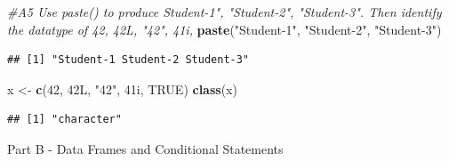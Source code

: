 \documentclass[
]{article}
\newenvironment{Shaded}{\begin{snugshade}}{\end{snugshade}}
\newcommand{\CommentTok}[1]{\textcolor[rgb]{0.56,0.35,0.01}{\textit{#1}}}
\newcommand{\ConstantTok}[1]{\textcolor[rgb]{0.56,0.35,0.01}{#1}}
\newcommand{\DataTypeTok}[1]{\textcolor[rgb]{0.13,0.29,0.53}{#1}}
\newcommand{\DecValTok}[1]{\textcolor[rgb]{0.00,0.00,0.81}{#1}}
\newcommand{\FunctionTok}[1]{\textcolor[rgb]{0.13,0.29,0.53}{\textbf{#1}}}
\newcommand{\NormalTok}[1]{#1}
\newcommand{\OtherTok}[1]{\textcolor[rgb]{0.56,0.35,0.01}{#1}}
\newcommand{\StringTok}[1]{\textcolor[rgb]{0.31,0.60,0.02}{#1}}
\begin{document}
\begin{Shaded}
\begin{Highlighting}[]
\CommentTok{\#A5 Use paste() to produce Student{-}1", "Student{-}2", "Student{-}3". Then identify the datatype of 42, 42L, "42", 41i,}
\FunctionTok{paste}\NormalTok{(}\StringTok{"Student{-}1"}\NormalTok{, }\StringTok{"Student{-}2"}\NormalTok{, }\StringTok{"Student{-}3"}\NormalTok{)}
\end{Highlighting}
\end{Shaded}

\begin{verbatim}
## [1] "Student-1 Student-2 Student-3"
\end{verbatim}

\begin{Shaded}
\begin{Highlighting}[]
\NormalTok{x }\OtherTok{\textless{}{-}} \FunctionTok{c}\NormalTok{(}\DecValTok{42}\NormalTok{, }\DecValTok{42}\DataTypeTok{L}\NormalTok{, }\StringTok{"42"}\NormalTok{, }\DecValTok{41}\DataTypeTok{i}\NormalTok{, }\ConstantTok{TRUE}\NormalTok{)}
\FunctionTok{class}\NormalTok{(x)}
\end{Highlighting}
\end{Shaded}

\begin{verbatim}
## [1] "character"
\end{verbatim}

Part B - Data Frames and Conditional Statements
\end{document}
